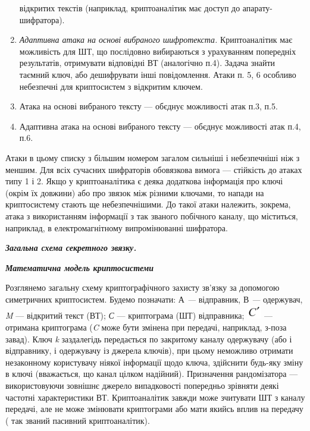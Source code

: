 \begin{enumerate}
відкритих текстів (наприклад, криптоаналітик має доступ до апарату-шифратора).
\item \textit{Адаптивна атака на основі вибраного шифротекста.} Криптоаналітик
має можливість для ШТ, що послідовно вибираються з урахуванням попередніх
результатів,  отримувати відповідні ВТ (аналогічно п.4). Задача знайти таємний
ключ, або дешифрувати інші повідомлення. Атаки п. 5, 6 особливо небезпечні для
криптосистем з відкритим ключем.
\item Атака на основі вибраного тексту  --- об{\textquotesingle}єднує можливості
атак п.3, п.5.
\item Адаптивна атака на основі вибраного тексту  --- об{\textquotesingle}єднує
можливості атак п.4, п.6.
\end{enumerate}

\bigskip

 Атаки в цьому списку з більшим номером загалом сильніші і небезпечніші  ніж з
меншим. Для всіх сучасних шифраторів обов{\textquotesingle}язкова вимога ---
стійкість до атаках типу 1 і 2. Якщо у криптоаналітика є деяка додаткова
інформація про ключі (окрім їх довжини) або про зв{\textquotesingle}язок між
різними ключами, то напади на криптосистему  стають ще небезпечнішими. До такої
атаки належить, зокрема, атака з використанням інформації з так званого
побічного каналу, що міститься, наприклад, в електромагнітному випромінюванні
шифратора.


\bigskip


\bigskip

{\centering\bfseries\itshape
Загальна схема секретного зв{\textquotesingle}язку.
\par}

{\centering\bfseries\itshape
 Математична модель криптосистеми
\par}


\bigskip


\bigskip

Розглянемо загальну схему криптографічного захисту зв’язку за допомогою
симетричних криптосистем.  Будемо позначати: А \textit{--- }відправник, В
\textit{--- }одержувач, \textit{M}\textit{ }--- відкритий текст (ВТ);
\textit{С}\textit{ }--- криптограма (ШТ) відправника; 
\includegraphics[width=0.252in,height=0.2398in]{crypt-img/crypt-img3.png} 
---отримана криптограма (\textit{C}\textit{ }може бути змінена при передачі,
наприклад, з-поза завад). Ключ \textit{k }заздалегідь передається по закритому
каналу одержувачу (або і відправнику, і одержувачу із джерела ключів), при
цьому неможливо отримати незаконному користувачу ніякої інформації щодо ключа,
здійснити будь-яку зміну в ключі  (вважається, що канал цілком надійний).
Призначення рандомізатора --- використовуючи  зовнішнє джерело випадковості
попередньо зрівняти деякі частотні характеристики ВТ.  Криптоаналітик завжди
може зчитувати ШТ з каналу передачі, але не може змінювати криптограми або мати
якийсь вплив на передачу ( так званий пасивний криптоаналітик).


